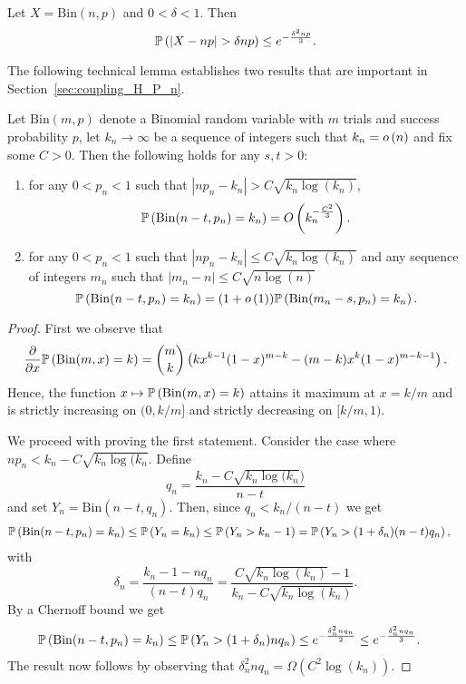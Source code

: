 \begin{appendices}
Let $X = \mathrm{Bin}(n,p)$ and $0 < \delta < 1$. Then
\[
	\mathbb{P}\left(|X - np| > \delta np\right) \le e^{-\frac{\delta^2 np}{3}}.
\]

The following technical lemma establishes two results that are important in Section~\ref{sec:coupling_H_P_n}.

\begin{lemma}\label{lem:concentration_height_binomial}
Let $\mathrm{Bin}(m,p)$ denote a Binomial random variable with $m$ trials and success probability $p$, let $k_n \to \infty$ be a sequence of integers such that $k_n = o\left(n\right)$ and fix some $C > 0$. Then the following holds for any $s, t > 0$:
\begin{enumerate}
\item for any $0 < p_n < 1$ such that $|n p_n - k_n| > C \sqrt{k_n \log(k_n)}$,
\[
	\mathbb{P}\left(\mathrm{Bin}(n-t,p_n) = k_n\right) = O\left(k_n^{-\frac{C^2}{3}}\right).
\]
\item for any $0 < p_n < 1$ such that $|n p_n - k_n| \le  C \sqrt{k_n \log(k_n)}$ and any sequence of integers $m_n$ such that $|m_n -n|\le C \sqrt{n \log(n)}$
\[
	\mathbb{P}\left(\mathrm{Bin}(n-t,p_n) = k_n\right) = (1+o\left(1\right))\mathbb{P}\left(\mathrm{Bin}(m_n-s,p_n) = k_n\right).
\]
\end{enumerate}
\end{lemma}

\begin{proof}
First we observe that
\[
	\frac{\partial}{\partial x} \mathbb{P}\left(\mathrm{Bin}(m,x) = k\right) = \binom{m}{k}\left(k x^{k-1}(1-x)^{m-k}
	- (m-k)x^k (1-x)^{m-k-1}\right).
\]
Hence, the function $x \mapsto \mathbb{P}\left(\mathrm{Bin}(m,x) = k\right)$ attains it maximum at $x = k/m$ and is strictly increasing on $(0,k/m]$ and strictly decreasing on $[k/m,1)$.

We proceed with proving the first statement. Consider the case where $n p_n < k_n - C \sqrt{k_n \log(k_n}$. Define 
\[
	q_n = \frac{k_n - C \sqrt{k_n \log(k_n})}{n-t}
\]
and set $Y_n = \mathrm{Bin}(n-t,q_n)$. Then, since $q_n < k_n/(n-t)$ we get
\begin{align*}
	\mathbb{P}\left(\mathrm{Bin}(n-t,p_n) = k_n\right) &\le \mathbb{P}\left(Y_n = k_n\right) \le \mathbb{P}\left(Y_n > k_n-1\right)
		= \mathbb{P}\left(Y_n > (1+\delta_n)(n-t)q_n\right),
\end{align*}
with
\[
	\delta_n = \frac{k_n - 1 -nq_n}{(n -t)q_n}
	= \frac{C \sqrt{k_n \log(k_n)} - 1}{k_n - C \sqrt{k_n \log(k_n)}}.
\]
By a Chernoff bound we get
\begin{align*}
	\mathbb{P}\left(\mathrm{Bin}(n-t,p_n) = k_n\right) &\le \mathbb{P}\left(Y_n > (1+\delta_n)nq_n\right)
		\le e^{-\frac{\delta_n^2 n q_n}{2}} \le e^{-\frac{\delta_n^2 n q_n}{3}}.
\end{align*}
The result now follows by observing that $\delta_n^2 n q_n = \Omega\left(C^2 \log(k_n)\right)$.


\end{proof}
\end{appendices}
